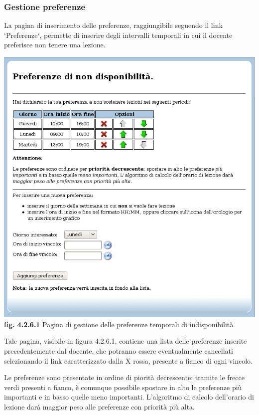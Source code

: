 \documentclass[11pt,a4paper]{article}
\begin{document}
\subsubsection{Gestione preferenze}
La pagina di inserimento delle preferenze, raggiungibile seguendo il link `Preferenze`, permette di inserire degli intervalli temporali in cui il docente preferisce non tenere una lezione.

\begin{center}
	\includegraphics[scale=0.5]{images/preferenze_docente.jpg}\\
	\textbf{fig. 4.2.6.1} Pagina di gestione delle preferenze temporali di indisponibilità\\
\end{center}
\bigskip

Tale pagina, visibile in figura 4.2.6.1, contiene una lista delle preferenze inserite precedentemente dal docente, che potranno essere eventualmente cancellati selezionando il link caratterizzato dalla X rossa, presente a fianco di ogni vincolo.

Le preferenze sono presentate in ordine di piorità decrescente: tramite le frecce verdi presenti a fianco, è comunque possibile spostare in alto le preferenze più importanti e in basso quelle meno importanti. L'algoritmo di calcolo dell'orario di lezione darà maggior peso alle preferenze con priorità più alta.
\end{document}
